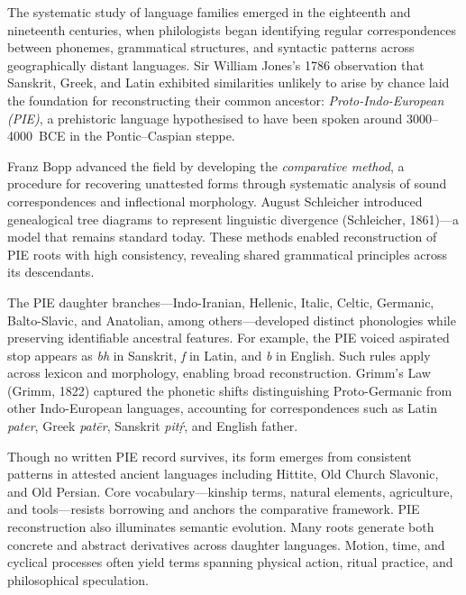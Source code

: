 \begin{historical}
    The systematic study of language families emerged in the eighteenth and nineteenth centuries, when philologists began identifying regular correspondences between phonemes, grammatical structures, and syntactic patterns across geographically distant languages. Sir William Jones's 1786 observation that Sanskrit, Greek, and Latin exhibited similarities unlikely to arise by chance laid the foundation for reconstructing their common ancestor: \textit{Proto-Indo-European (PIE)}, a prehistoric language hypothesised to have been spoken around 3000–4000~BCE in the Pontic–Caspian steppe.

    Franz Bopp advanced the field by developing the \textit{comparative method}, a procedure for recovering unattested forms through systematic analysis of sound correspondences and inflectional morphology. August Schleicher introduced genealogical tree diagrams to represent linguistic divergence (Schleicher, 1861)—a model that remains standard today. These methods enabled reconstruction of PIE roots with high consistency, revealing shared grammatical principles across its descendants.

    The PIE daughter branches—Indo-Iranian, Hellenic, Italic, Celtic, Germanic, Balto-Slavic, and Anatolian, among others—developed distinct phonologies while preserving identifiable ancestral features. For example, the PIE voiced aspirated stop  appears as \emph{bh} in Sanskrit, \emph{f} in Latin, and \emph{b} in English. Such rules apply across lexicon and morphology, enabling broad reconstruction. Grimm's Law (Grimm, 1822) captured the phonetic shifts distinguishing Proto-Germanic from other Indo-European languages, accounting for correspondences such as Latin \emph{pater}, Greek \emph{patēr}, Sanskrit \emph{pitṛ́}, and English \QSOpen{}father.\QSClose{}
    
    Though no written PIE record survives, its form emerges from consistent patterns in attested ancient languages including Hittite, Old Church Slavonic, and Old Persian. Core vocabulary—kinship terms, natural elements, agriculture, and tools—resists borrowing and anchors the comparative framework.
    PIE reconstruction also illuminates semantic evolution. Many roots generate both concrete and abstract derivatives across daughter languages. Motion, time, and cyclical processes often yield terms spanning physical action, ritual practice, and philosophical speculation.
\end{historical}